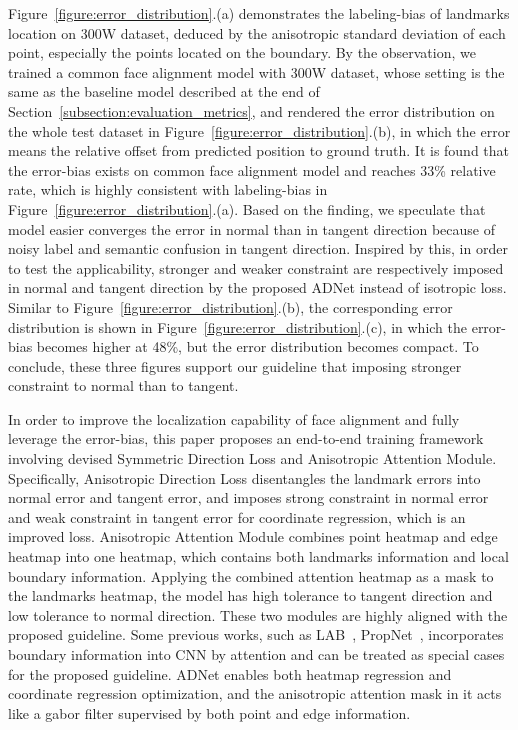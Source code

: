\documentclass[10pt,twocolumn,letterpaper]{article}
\begin{document}
Figure~\ref{figure:error_distribution}.(a) demonstrates the labeling-bias of landmarks location on 300W dataset, deduced by the anisotropic standard deviation of each point, especially the points located on the boundary. By the observation, we trained a common face alignment model with 300W dataset, whose setting is the same as the baseline model described at the end of Section~\ref{subsection:evaluation_metrics}, and rendered the error distribution on the whole test dataset in Figure~\ref{figure:error_distribution}.(b), in which the error means the relative offset from predicted position to ground truth. It is found that the error-bias exists on common face alignment model and reaches 33\% relative rate, which is highly consistent with labeling-bias in Figure~\ref{figure:error_distribution}.(a). Based on the finding, we speculate that model easier converges the error in normal than in tangent direction because of noisy label and semantic confusion in tangent direction. Inspired by this, in order to test the applicability, stronger and weaker constraint are respectively imposed in normal and tangent direction by the proposed ADNet instead of isotropic loss. Similar to Figure~\ref{figure:error_distribution}.(b), the corresponding error distribution is shown in Figure~\ref{figure:error_distribution}.(c), in which the error-bias becomes higher at 48\%, but the error distribution becomes compact. To conclude, these three figures support our guideline that imposing stronger constraint to normal than to tangent.

In order to improve the localization capability of face alignment and fully leverage the error-bias, this paper proposes an end-to-end training framework involving devised Symmetric Direction Loss and Anisotropic Attention Module. Specifically, Anisotropic Direction Loss disentangles the landmark errors into normal error and tangent error, and imposes strong constraint in normal error and weak constraint in tangent error for coordinate regression, which is an improved  loss. Anisotropic Attention Module combines point heatmap and edge heatmap into one heatmap, which contains both landmarks information and local boundary information. Applying the combined attention heatmap as a mask to the landmarks heatmap, the model has high tolerance to tangent direction and low tolerance to normal direction. These two modules are highly aligned with the proposed guideline. Some previous works, such as LAB~\cite{wu2018look}, PropNet~\cite{huang2020propagationnet}, incorporates boundary information into CNN by attention and can be treated as special cases for the proposed guideline. ADNet enables both heatmap regression and coordinate regression optimization, and the anisotropic attention mask in it acts like a gabor filter supervised by both point and edge information. 
\end{document}
